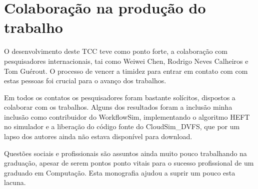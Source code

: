 \section{Colaboração na produção do trabalho} %
\label{sec:colaboracao_na_producao_do_trabalho}

O desenvolvimento deste TCC teve como ponto forte, a colaboração com
pesquisadores internacionais, tai como Weiwei Chen, Rodrigo Neves Calheiros e
Tom Guérout. O processo de vencer a timidez para entrar em contato com com estas
pessoas foi crucial para o avanço dos trabalhos.

Em todos os contatos os pesquisadores foram bastante solícitos, dispostos a
colaborar com os trabalhos. Alguns dos resultados foram a inclusão minha
inclusão como contribuidor do WorkflowSim, implementando o algoritmo HEFT no
simulador e a liberação do código fonte do CloudSim\_DVFS, que por um lapso dos
autores ainda não estava disponível para download.

Questões sociais e profissionais são assuntos ainda muito pouco trabalhando na
graduação, apesar de serem pontos ponto vitais para o sucesso profissional de um
graduado em Computação. Esta monografia ajudou a suprir um pouco esta lacuna.


